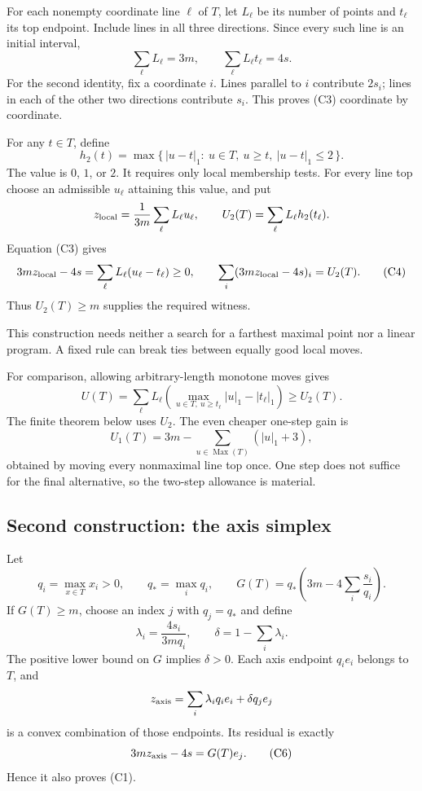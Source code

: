 \documentclass[
  11pt,
  a4paper,
]{article}
\begin{document}
For each nonempty coordinate line \(\ell\) of \(T\), let \(L_\ell\) be
its number of points and \(t_\ell\) its top endpoint. Include lines in
all three directions. Since every such line is an initial interval, \[
\sum_\ell L_\ell=3m,\qquad
\sum_\ell L_\ell t_\ell=4s.
\tag{C3}
\] For the second identity, fix a coordinate \(i\). Lines parallel to
\(i\) contribute \(2s_i\); lines in each of the other two directions
contribute \(s_i\). This proves (C3) coordinate by coordinate.

For any \(t\in T\), define \[
h_2(t)=
\max\{\,|u-t|_1:\ u\in T,\ u\ge t,\ |u-t|_1\le2\,\}.
\] The value is \(0\), \(1\), or \(2\). It requires only local
membership tests. For every line top choose an admissible \(u_\ell\)
attaining this value, and put \[
z_{\rm local}=\frac1{3m}\sum_\ell L_\ell u_\ell,\qquad
U_2(T)=\sum_\ell L_\ell h_2(t_\ell).
\] Equation (C3) gives \[
3mz_{\rm local}-4s
=\sum_\ell L_\ell(u_\ell-t_\ell)\ge0,\qquad
\sum_i(3mz_{\rm local}-4s)_i=U_2(T).
\tag{C4}
\] Thus \(U_2(T)\ge m\) supplies the required witness.

This construction needs neither a search for a farthest maximal point
nor a linear program. A fixed rule can break ties between equally good
local moves.

For comparison, allowing arbitrary-length monotone moves gives \[
U(T)=\sum_\ell L_\ell
\left(\max_{u\in T,\ u\ge t_\ell}|u|_1-|t_\ell|_1\right)\ge U_2(T).
\] The finite theorem below uses \(U_2\). The even cheaper one-step gain
is \[
U_1(T)=3m-\sum_{u\in\operatorname{Max}(T)}(|u|_1+3),
\] obtained by moving every nonmaximal line top once. One step does not
suffice for the final alternative, so the two-step allowance is
material.

\hypertarget{second-construction-the-axis-simplex}{%
\subsection{Second construction: the axis
simplex}\label{second-construction-the-axis-simplex}}

Let \[
q_i=\max_{x\in T}x_i>0,\qquad q_*=\max_i q_i,\qquad
G(T)=q_*\left(3m-4\sum_i\frac{s_i}{q_i}\right).
\tag{C5}
\] If \(G(T)\ge m\), choose an index \(j\) with \(q_j=q_*\) and define
\[
\lambda_i=\frac{4s_i}{3mq_i},\qquad
\delta=1-\sum_i\lambda_i.
\] The positive lower bound on \(G\) implies \(\delta>0\). Each axis
endpoint \(q_i e_i\) belongs to \(T\), and \[
z_{\rm axis}=\sum_i\lambda_iq_i e_i+\delta q_j e_j
\] is a convex combination of those endpoints. Its residual is exactly
\[
3mz_{\rm axis}-4s=G(T)e_j.
\tag{C6}
\] Hence it also proves (C1).
\end{document}

